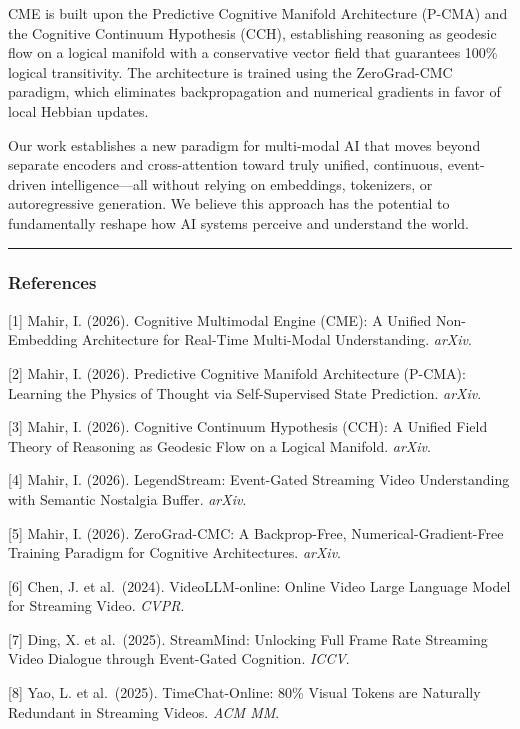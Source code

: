 \documentclass[
  11pt,
  a4paper,
]{article}
\begin{document}
CME is built upon the Predictive Cognitive Manifold Architecture (P-CMA)
and the Cognitive Continuum Hypothesis (CCH), establishing reasoning as
geodesic flow on a logical manifold with a conservative vector field
that guarantees 100\% logical transitivity. The architecture is trained
using the ZeroGrad-CMC paradigm, which eliminates backpropagation and
numerical gradients in favor of local Hebbian updates.

Our work establishes a new paradigm for multi-modal AI that moves beyond
separate encoders and cross-attention toward truly unified, continuous,
event-driven intelligence---all without relying on embeddings,
tokenizers, or autoregressive generation. We believe this approach has
the potential to fundamentally reshape how AI systems perceive and
understand the world.

\begin{center}\rule{0.5\linewidth}{0.5pt}\end{center}

\subsubsection{References}\label{references-4}

{[}1{]} Mahir, I. (2026). Cognitive Multimodal Engine (CME): A Unified
Non-Embedding Architecture for Real-Time Multi-Modal Understanding.
\emph{arXiv}.

{[}2{]} Mahir, I. (2026). Predictive Cognitive Manifold Architecture
(P-CMA): Learning the Physics of Thought via Self-Supervised State
Prediction. \emph{arXiv}.

{[}3{]} Mahir, I. (2026). Cognitive Continuum Hypothesis (CCH): A
Unified Field Theory of Reasoning as Geodesic Flow on a Logical
Manifold. \emph{arXiv}.

{[}4{]} Mahir, I. (2026). LegendStream: Event-Gated Streaming Video
Understanding with Semantic Nostalgia Buffer. \emph{arXiv}.

{[}5{]} Mahir, I. (2026). ZeroGrad-CMC: A Backprop-Free,
Numerical-Gradient-Free Training Paradigm for Cognitive Architectures.
\emph{arXiv}.

{[}6{]} Chen, J. et al.~(2024). VideoLLM-online: Online Video Large
Language Model for Streaming Video. \emph{CVPR}.

{[}7{]} Ding, X. et al.~(2025). StreamMind: Unlocking Full Frame Rate
Streaming Video Dialogue through Event-Gated Cognition. \emph{ICCV}.

{[}8{]} Yao, L. et al.~(2025). TimeChat-Online: 80\% Visual Tokens are
Naturally Redundant in Streaming Videos. \emph{ACM MM}.
\end{document}
